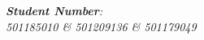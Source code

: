 \begin{titlepage}
\begin{center}
		\textit{\textbf{Student Number}: \\ 501185010 \& 501209136 \& 501179049}
            
        \vspace{2cm}
            
        \Large
         
		\vspace{0.25cm}                  
            
        \vspace{0.25cm}
           
            
    \end{center}
\end{titlepage}



